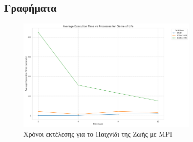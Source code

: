 \documentclass{article}
\begin{document}
\subsection*{Γραφήματα}
\begin{figure}[h]
    \centering
    \includegraphics[width=0.8\textwidth]{game_of_life_mpi_results.png}
    \caption{Χρόνοι εκτέλεσης για το Παιχνίδι της Ζωής με MPI}
\end{figure}
\end{document}
